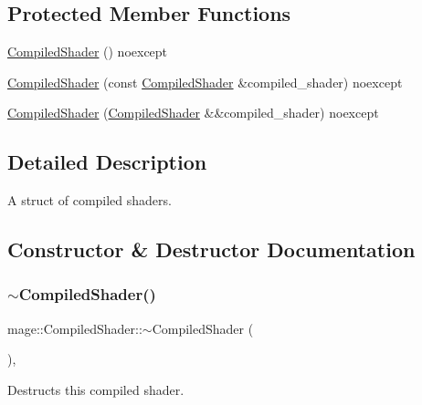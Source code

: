 \subsection*{Protected Member Functions}
\begin{DoxyCompactItemize}
\item 
\hyperlink{classmage_1_1_compiled_shader_a805edf097fd7b7af5c6e4f3829db2eda}{Compiled\+Shader} () noexcept
\item 
\hyperlink{classmage_1_1_compiled_shader_a2b7a4b283254781d5420e562d58fc49d}{Compiled\+Shader} (const \hyperlink{classmage_1_1_compiled_shader}{Compiled\+Shader} \&compiled\+\_\+shader) noexcept
\item 
\hyperlink{classmage_1_1_compiled_shader_a3f497ba71462ff3407d72034fee71c06}{Compiled\+Shader} (\hyperlink{classmage_1_1_compiled_shader}{Compiled\+Shader} \&\&compiled\+\_\+shader) noexcept
\end{DoxyCompactItemize}


\subsection{Detailed Description}
A struct of compiled shaders. 

\subsection{Constructor \& Destructor Documentation}
\hypertarget{classmage_1_1_compiled_shader_a40805ed2bcd988824d130aeb07200f21}{}\label{classmage_1_1_compiled_shader_a40805ed2bcd988824d130aeb07200f21} 
\subsubsection{\texorpdfstring{$\sim$\+Compiled\+Shader()}{~CompiledShader()}}
{\footnotesize\ttfamily mage\+::\+Compiled\+Shader\+::$\sim$\+Compiled\+Shader (\begin{DoxyParamCaption}{ }\end{DoxyParamCaption})\hspace{0.3cm}{\ttfamily [virtual]}, {\ttfamily [default]}}

Destructs this compiled shader. \hypertarget{classmage_1_1_compiled_shader_a805edf097fd7b7af5c6e4f3829db2eda}{}\label{classmage_1_1_compiled_shader_a805edf097fd7b7af5c6e4f3829db2eda} 
